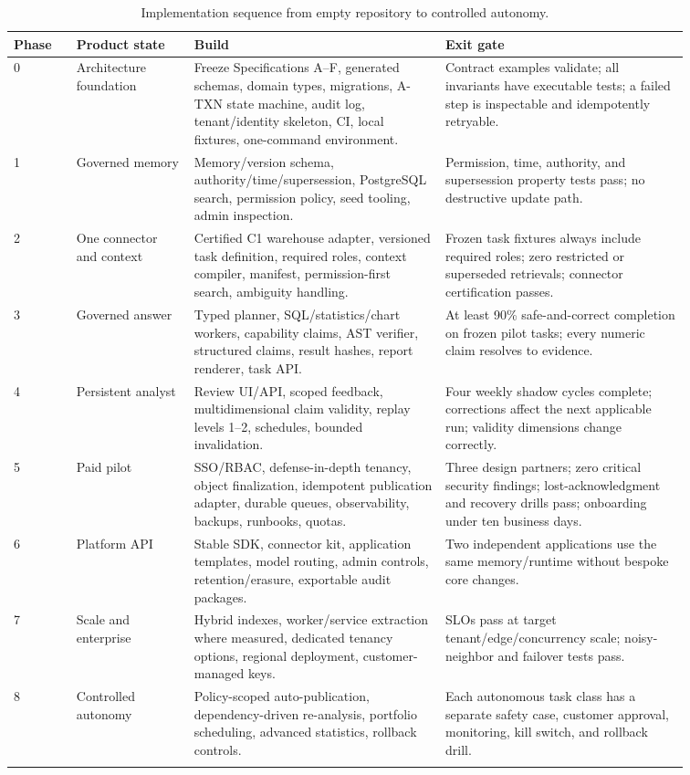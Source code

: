 \documentclass[10pt]{article}
\newcommand{\atxn}{\textsc{A-TXN}\xspace}
\begin{document}
\begin{longtable}{L{0.08\linewidth}L{0.15\linewidth}L{0.32\linewidth}L{0.31\linewidth}}
\toprule
\textbf{Phase} & \textbf{Product state} & \textbf{Build} & \textbf{Exit gate} \\
\midrule
{} & Architecture foundation & Freeze Specifications A--F, generated schemas, domain types, migrations, \atxn state machine, audit log, tenant/identity skeleton, CI, local fixtures, one-command environment. & Contract examples validate; all invariants have executable tests; a failed step is inspectable and idempotently retryable. \\
1 & Governed memory & Memory/version schema, authority/time/supersession, PostgreSQL search, permission policy, seed tooling, admin inspection. & Permission, time, authority, and supersession property tests pass; no destructive update path. \\
2 & One connector and context & Certified C1 warehouse adapter, versioned task definition, required roles, context compiler, manifest, permission-first search, ambiguity handling. & Frozen task fixtures always include required roles; zero restricted or superseded retrievals; connector certification passes. \\
3 & Governed answer & Typed planner, SQL/statistics/chart workers, capability claims, AST verifier, structured claims, result hashes, report renderer, task API. & At least 90\% safe-and-correct completion on frozen pilot tasks; every numeric claim resolves to evidence. \\
4 & Persistent analyst & Review UI/API, scoped feedback, multidimensional claim validity, replay levels 1--2, schedules, bounded invalidation. & Four weekly shadow cycles complete; corrections affect the next applicable run; validity dimensions change correctly. \\
5 & Paid pilot & SSO/RBAC, defense-in-depth tenancy, object finalization, idempotent publication adapter, durable queues, observability, backups, runbooks, quotas. & Three design partners; zero critical security findings; lost-acknowledgment and recovery drills pass; onboarding under ten business days. \\
6 & Platform API & Stable SDK, connector kit, application templates, model routing, admin controls, retention/erasure, exportable audit packages. & Two independent applications use the same memory/runtime without bespoke core changes. \\
7 & Scale and enterprise & Hybrid indexes, worker/service extraction where measured, dedicated tenancy options, regional deployment, customer-managed keys. & SLOs pass at target tenant/edge/concurrency scale; noisy-neighbor and failover tests pass. \\
8 & Controlled autonomy & Policy-scoped auto-publication, dependency-driven re-analysis, portfolio scheduling, advanced statistics, rollback controls. & Each autonomous task class has a separate safety case, customer approval, monitoring, kill switch, and rollback drill. \\
\bottomrule
\caption{Implementation sequence from empty repository to controlled autonomy.}
\end{longtable}
\end{document}
